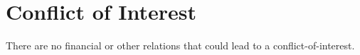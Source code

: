 \section{Conflict of Interest}

There are no financial or other relations that could lead to a conflict-of-interest.
